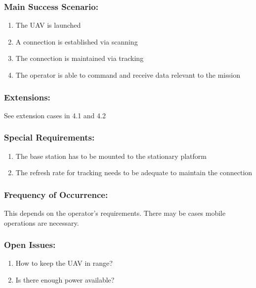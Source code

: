 \documentclass[ProductRequirements.tex]{subfiles}
\begin{document}
	\subsubsection*{Main Success Scenario:}
	\begin{enumerate}\itemsep1pt
		\item The UAV is launched
		\item A connection is established via scanning
		\item The connection is maintained via tracking
		\item The operator is able to command and receive data relevant to the mission 
	\end{enumerate}
	\subsubsection*{Extensions:}
	See extension cases in 4.1 and 4.2
	\subsubsection*{Special Requirements:}
	\begin{enumerate}\itemsep1pt
		\item The base station has to be mounted to the stationary platform
		\item The refresh rate for tracking needs to be adequate to maintain the connection
	\end{enumerate}
	\subsubsection*{Frequency of Occurrence:}
	This depends on the operator's requirements. There may be cases mobile operations are necessary.
	\subsubsection*{Open Issues:}
	\begin{enumerate}\itemsep1pt
		\item How to keep the UAV in range?
		\item Is there enough power available?
	\end{enumerate}		

		
\end{document}
